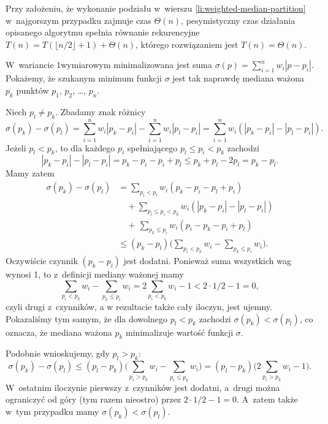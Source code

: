 Przy założeniu, że wykonanie podziału w~wierszu \ref{li:weighted-median-partition} w~najgorszym przypadku zajmuje czas $\Theta(n)$, pesymistyczny czas działania opisanego algorytmu spełnia równanie rekurencyjne $T(n)=T(\lfloor n/2\rfloor+1)+\Theta(n)$, którego rozwiązaniem jest $T(n)=\Theta(n)$.

\subproblem %
W~wariancie 1\nbhyphen wymiarowym minimalizowana jest suma $\sigma(p)=\sum_{i=1}^nw_i|p-p_i|$.
Pokażemy, że szukanym minimum funkcji $\sigma$ jest tak naprawdę mediana ważona $p_k$ punktów $p_1$, $p_2$, \dots, $p_n$.

Niech $p_l\ne p_k$.
Zbadamy znak różnicy
\[
    \sigma(p_k)-\sigma(p_l) = \sum_{i=1}^nw_i|p_k-p_i|-\sum_{i=1}^nw_i|p_l-p_i| = \sum_{i=1}^nw_i(|p_k-p_i|-|p_l-p_i|).
\]
Jeżeli $p_l<p_k$, to dla każdego $p_i$ spełniającego $p_l\le p_i<p_k$ zachodzi
\[
    |p_k-p_i|-|p_l-p_i|=p_k-p_i-p_i+p_l\le p_k+p_l-2p_l=p_k-p_l.
\]
Mamy zatem
\begin{align*}
    \sigma(p_k)-\sigma(p_l) &= \sum_{p_i<p_l}w_i(p_k-p_i-p_l+p_i) \\
	&\quad {}+\!\!\!\sum_{p_l\le p_i<p_k}\!\!\!\!w_i(|p_k-p_i|-|p_l-p_i|) \\
	&\quad {}+\,\sum_{p_k\le p_i}w_i(p_i-p_k-p_i+p_l) \\
	&\le (p_k-p_l)\biggl(\sum_{p_i<p_k}w_i-\sum_{p_k\le p_i}w_i\biggr).
\end{align*}
Oczywiście czynnik $(p_k-p_l)$ jest dodatni.
Ponieważ suma wszystkich wag wynosi 1, to z~definicji mediany ważonej mamy
\[
    \sum_{p_i<p_k}w_i-\sum_{p_k\le p_i}w_i = 2\sum_{p_i<p_k}w_i-1 < 2\cdot1/2-1 = 0,
\]
czyli drugi z~czynników, a w rezultacie także cały iloczyn, jest ujemny.
Pokazaliśmy tym samym, że dla dowolnego $p_l<p_k$ zachodzi $\sigma(p_k)<\sigma(p_l)$, co oznacza, że mediana ważona $p_k$ minimalizuje wartość funkcji $\sigma$.

Podobnie wnioskujemy, gdy $p_l>p_k$:
\[
    \sigma(p_k)-\sigma(p_l) \le (p_l-p_k)\biggl(\sum_{p_i>p_k}w_i-\sum_{p_i\le p_k}w_i\biggr) = (p_l-p_k)\biggl(2\sum_{p_i>p_k}w_i-1\biggr).
\]
W~ostatnim iloczynie pierwszy z~czynników jest dodatni, a~drugi można ograniczyć od góry (tym razem nieostro) przez $2\cdot1/2-1=0$.
A~zatem także w~tym przypadku mamy $\sigma(p_k)<\sigma(p_l)$.

\subproblem %

